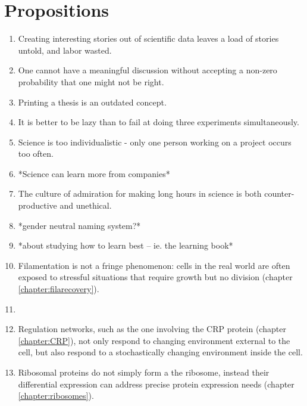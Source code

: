 

\chapter*{Propositions}

\begin{enumerate}
    \item Creating interesting stories out of scientific data leaves a load of stories untold, and labor wasted.    
    \item One cannot have a meaningful discussion without accepting a non-zero probability that one might not be right.
    \item Printing a thesis is an outdated concept.
    \item It is better to be lazy than to fail at doing three experiments simultaneously.
    \item Science is too individualistic - only one person working on a project occurs too often.
    \item *Science can learn more from companies*
    \item The culture of admiration for making long hours in science is both counter-productive and unethical.
    \item *gender neutral naming system?*
    \item *about studying how to learn best -- ie. the learning book*
    \item Filamentation is not a fringe phenomenon: cells in the real world are often exposed to stressful situations that require growth but no division (chapter \ref{chapter:filarecovery}).
    \item 
    \item Regulation networks, such as the one involving the CRP protein (chapter \ref{chapter:CRP}), not only respond to changing environment external to the cell, but also respond to a stochastically changing environment inside the cell.
    \item Ribosomal proteins do not simply form a the ribosome, instead their differential expression can address precise protein expression needs (chapter \ref{chapter:ribosomes}).
\end{enumerate}



